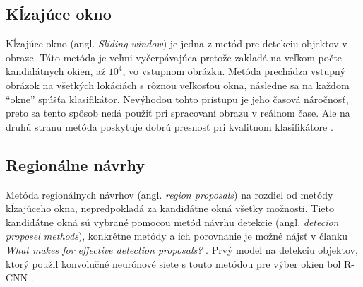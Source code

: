 \begin{comment}
    \subsubsection{Vyhľadávač na základe vizuálnej podobnosti obrázkov}
    Jednu z možných aplikácií detekcie objektov v obraze využíva Pinterest\footnote{\url{https://medium.com/@Pinterest_Engineering/introducing-automatic-object-detection-to-visual-search-e57c29191c30}}.
    Používaju detekciu objektov pre indexovanie rôznych častí obrázka.
    Týmto spôsobom si môže užívateľ pri hľadaní napr. špecifickej kabelky alebo topánok nájsť aj jej podobné.
    \begin{figure}[H]
        \centering
        \texttt{[image: purse]}
        \caption{Prototyp automatického označovania a vyhľadávania objektov \cite{odkaz:ObjectDetectionOverview}}
        \label{pic:kNN}
    \end{figure}
\end{comment}

\subsection{Kĺzajúce okno}
\label{subsec:slidingwindow}
Kĺzajúce okno (angl. \textit{Sliding window}) je jedna z metód pre detekciu objektov v obraze.
Táto metóda je veľmi vyčerpávajúca pretože zakladá na veľkom počte kandidátnych okien, až $10^4$, vo vstupnom obrázku.
Metóda prechádza vstupný obrázok na všetkých lokáciách s rôznou veľkosťou okna, následne sa na každom ``okne'' spúšťa klasifikátor.
Nevýhodou tohto prístupu je jeho časová náročnosť, preto sa tento spôsob nedá použiť pri spracovaní obrazu v reálnom čase.
Ale na druhú stranu metóda poskytuje dobrú presnosť pri kvalitnom klasifikátore \cite{prop:AutomaticHandgunDetection}.

\subsection{Regionálne návrhy}
\label{subsec:regionproposal}
Metóda regionálnych návrhov (angl. \textit{region proposals}) na rozdiel od metódy kĺzajúceho okna, nepredpokladá za kandidátne okná všetky možnosti.
Tieto kandidátne okná sú vybrané pomocou metód návrhu detekcie (angl. \textit{detecion proposel methods}), konkrétne metódy
    a ich porovnanie je možné nájsť v članku \textit{What makes for effective detection proposals?} \cite{prop:ProposalMethods}.
Prvý model na detekciu objektov, ktorý použil konvolučné neurónové siete s touto metódou pre výber okien bol R-CNN \cite{prop:AutomaticHandgunDetection}.
